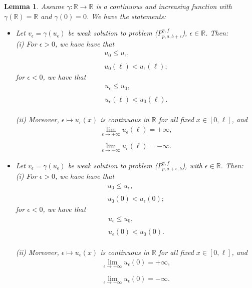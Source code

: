 \documentclass[reqno,12pt]{amsart}
\newtheorem{lemma}[theorem]{Lemma} %
\numberwithin{equation}{section} %
\begin{document}
  \begin{lemma}\label{lemma3} Assume $\gamma:\mathbb{R}\to \mathbb{R}$ is a continuous and increasing function with $\gamma(\mathbb{R})=\mathbb{R}$ and $\gamma(0)=0$. We have the  statements:
 \begin{itemize}
 \item[1.]  Let $v_\epsilon=\gamma(u_\epsilon)$ be weak solution to problem ($P_{p,a,b+\epsilon}^{\gamma,f}$),  $\epsilon \in \mathbb{R}$. Then:
\\ (i)  For $\epsilon>0$, we have have that
 $$\begin{array}{l}\displaystyle 
 u_0 \leq u_\epsilon,
 \\ \\
 \displaystyle u_0(\ell) <u_\epsilon(\ell);
\end{array} $$ 
  for $\epsilon<0$, we have that 
  $$\begin{array}{l}\displaystyle u_\epsilon\le u_0,
   \\ \\
 \displaystyle 
u_\epsilon(\ell)<u_0(\ell).
\end{array} $$ 
 \\ (ii) Moreover, $\epsilon\mapsto u_\epsilon(x)$ is continuous in $\mathbb{R}$ for all fixed $x\in[0,\ell]$, and 
\begin{equation}\label{ran001}
\begin{array}{l}
\displaystyle \lim_{\epsilon \to  +\infty} u_\epsilon(\ell) =  +\infty,
 \\ \\
\displaystyle \lim_{\epsilon \to  -\infty} u_\epsilon(\ell) =  -\infty.
\end{array} \end{equation}


  \item[2.] Let $v_\epsilon=\gamma(u_\epsilon)$ be weak solution to problem ($P_{p,a+\epsilon,b}^{\gamma,f}$), with $\epsilon \in \mathbb{R}$. Then:
  \\ (i)  For $\epsilon>0$, we have have that
 $$\begin{array}{l}\displaystyle 
 u_0 \leq u_\epsilon,
 \\ \\
 \displaystyle u_0(0) <u_\epsilon(0);
\end{array} $$ 
  for $\epsilon<0$, we have that 
  $$\begin{array}{l}\displaystyle u_\epsilon\le u_0,
   \\ \\
\displaystyle 
u_\epsilon(0)<u_0(0).
\end{array} $$ 
 \\ (ii) Moreover, $\epsilon\mapsto u_\epsilon(x)$ is continuous in $\mathbb{R}$ for all fixed $x\in[0,\ell]$, and 
\begin{equation}\label{ran001dos001}
\begin{array}{l}
\displaystyle \lim_{\epsilon \to  +\infty} u_\epsilon(0) =  +\infty,
 \\
\\
\displaystyle \lim_{\epsilon \to  -\infty} u_\epsilon(0) =  -\infty.
\end{array} \end{equation}


\end{itemize}
\end{lemma}
\end{document}

